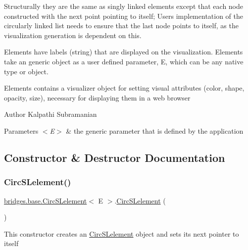 Structurally they are the same as singly linked elements except that each node constructed with the next point pointing to itself; User\textquotesingle{}s implementation of the circularly linked list needs to ensure that the last node points to itself, as the visualization generation is dependent on this.

Elements have labels (string) that are displayed on the visualization. Elements take an generic object as a user defined parameter, E, which can be any native type or object.

Elements contains a visualizer object for setting visual attributes (color, shape, opacity, size), necessary for displaying them in a web browser

\begin{DoxyAuthor}{Author}
Kalpathi Subramanian
\end{DoxyAuthor}

\begin{DoxyParams}{Parameters}
{\em $<$\+E$>$} & the generic parameter that is defined by the application \\
\hline
\end{DoxyParams}


\subsection{Constructor \& Destructor Documentation}
\hypertarget{classbridges_1_1base_1_1_circ_s_lelement_a4a5a58cc7a0ec5170a828861c11df1b3}{}\label{classbridges_1_1base_1_1_circ_s_lelement_a4a5a58cc7a0ec5170a828861c11df1b3} 
\subsubsection{\texorpdfstring{Circ\+S\+Lelement()}{CircSLelement()}\hspace{0.1cm}{\footnotesize\ttfamily [1/4]}}
{\footnotesize\ttfamily \hyperlink{classbridges_1_1base_1_1_circ_s_lelement}{bridges.\+base.\+Circ\+S\+Lelement}$<$ E $>$.\hyperlink{classbridges_1_1base_1_1_circ_s_lelement}{Circ\+S\+Lelement} (\begin{DoxyParamCaption}{ }\end{DoxyParamCaption})}

This constructor creates an \hyperlink{classbridges_1_1base_1_1_circ_s_lelement}{Circ\+S\+Lelement} object and sets its next pointer to itself \hypertarget{classbridges_1_1base_1_1_circ_s_lelement_a213d61713e51295d756669def911f080}{}\label{classbridges_1_1base_1_1_circ_s_lelement_a213d61713e51295d756669def911f080} 
